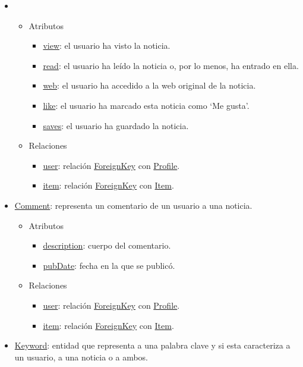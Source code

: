 \begin{itemize}
    \item \begin{itemize}
        \item Atributos
        \begin{itemize}
            \item \underline{view}: el usuario ha visto la noticia.
            \item \underline{read}: el usuario ha leído la noticia o, por lo menos, ha entrado en ella.
            \item \underline{web}: el usuario ha accedido a la web original de la noticia.
            \item \underline{like}: el usuario ha marcado esta noticia como ‘Me gusta’.
            \item \underline{saves}: el usuario ha guardado la noticia.
        \end{itemize}
        \item Relaciones
        \begin{itemize}
            \item \underline{user}: relación \underline{ForeignKey} con \underline{Profile}.
            \item \underline{item}: relación \underline{ForeignKey} con \underline{Item}.
        \end{itemize}
    \end{itemize}
    \item \underline{Comment}: representa un comentario de un usuario a una noticia.
    \begin{itemize}
        \item Atributos
        \begin{itemize}
            \item \underline{description}: cuerpo del comentario.
            \item \underline{pubDate}: fecha en la que se publicó.
        \end{itemize}
        \item Relaciones
        \begin{itemize}
            \item \underline{user}: relación \underline{ForeignKey} con \underline{Profile}.
            \item \underline{item}: relación \underline{ForeignKey} con \underline{Item}.
        \end{itemize}
    \end{itemize}
    \item \underline{Keyword}: entidad que representa a una palabra clave y si esta caracteriza a un usuario, a una noticia o a ambos.

\end{itemize}
